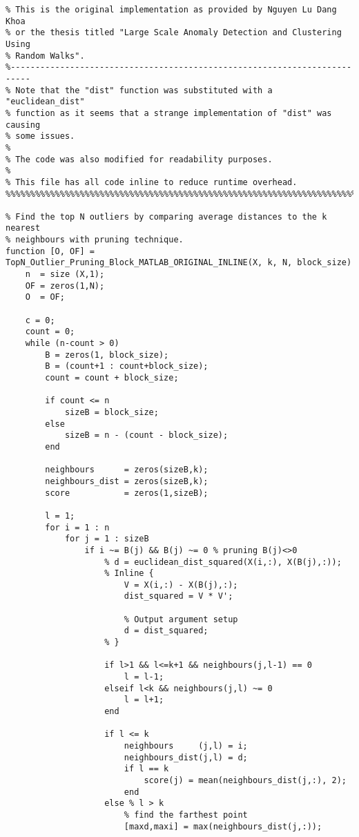 \begin{lstlisting}
% This is the original implementation as provided by Nguyen Lu Dang Khoa
% or the thesis titled "Large Scale Anomaly Detection and Clustering Using
% Random Walks".
%--------------------------------------------------------------------------
% Note that the "dist" function was substituted with a "euclidean_dist"
% function as it seems that a strange implementation of "dist" was causing
% some issues.
%
% The code was also modified for readability purposes.
%
% This file has all code inline to reduce runtime overhead.
%%%%%%%%%%%%%%%%%%%%%%%%%%%%%%%%%%%%%%%%%%%%%%%%%%%%%%%%%%%%%%%%%%%%%%%%%%%

% Find the top N outliers by comparing average distances to the k nearest
% neighbours with pruning technique.
function [O, OF] = TopN_Outlier_Pruning_Block_MATLAB_ORIGINAL_INLINE(X, k, N, block_size)
    n  = size (X,1);
    OF = zeros(1,N);
    O  = OF;

    c = 0;
    count = 0;
    while (n-count > 0)
        B = zeros(1, block_size);
        B = (count+1 : count+block_size);
        count = count + block_size;

        if count <= n
            sizeB = block_size;
        else
            sizeB = n - (count - block_size);
        end

        neighbours      = zeros(sizeB,k);
        neighbours_dist = zeros(sizeB,k);
        score           = zeros(1,sizeB);

        l = 1;
        for i = 1 : n
            for j = 1 : sizeB
                if i ~= B(j) && B(j) ~= 0 % pruning B(j)<>0
                    % d = euclidean_dist_squared(X(i,:), X(B(j),:));
                    % Inline {
                        V = X(i,:) - X(B(j),:);
                        dist_squared = V * V';

                        % Output argument setup
                        d = dist_squared;
                    % }

                    if l>1 && l<=k+1 && neighbours(j,l-1) == 0
                        l = l-1;
                    elseif l<k && neighbours(j,l) ~= 0
                        l = l+1;
                    end

                    if l <= k
                        neighbours     (j,l) = i;
                        neighbours_dist(j,l) = d;
                        if l == k
                            score(j) = mean(neighbours_dist(j,:), 2);
                        end
                    else % l > k
                        % find the farthest point
                        [maxd,maxi] = max(neighbours_dist(j,:));


\end{lstlisting}
